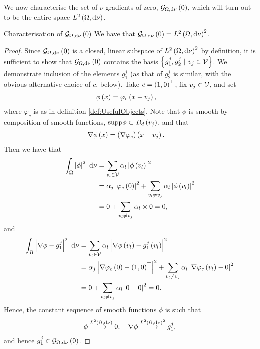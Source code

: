 We now characterise the set of $\nu$-gradients of zero, $\mathcal{G}_{ \Omega, \mathrm{d}\nu}\left( 0 \right)$, which will turn out to be the entire space $L^{2}\left( \Omega,\mathrm{d}\nu \right)$.
\begin{prop}{Characterisation of $\mathcal{G}_{ \Omega, \mathrm{d}\nu}\left( 0 \right)$} \label{prop:CharPointMassGradZero}
	We have that $\mathcal{G}_{ \Omega, \mathrm{d}\nu}\left( 0 \right) = L^{2}\left( \Omega,\mathrm{d}\nu \right)^2$.
\end{prop}
\begin{proof}
	Since $\mathcal{G}_{ \Omega, \mathrm{d}\nu}\left( 0 \right)$ is a closed, linear subspace of $L^{2}\left( \Omega,\mathrm{d}\nu \right)^2$ by definition, it is sufficient to show that $\mathcal{G}_{ \Omega, \mathrm{d}\nu}\left( 0 \right)$ contains the basis $\clbracs{g_1^j, g_2^j \ \vert \ v_j\in\vertSet}$.
	We demonstrate inclusion of the elements $g^j_1$ (as that of $g^j_2$ is similar, with the obvious alternative choice of $c$, below).
	Take $c=\left( 1,0 \right)^{\top}$, fix $v_j\in\mathcal{V}$, and set
	\begin{align*}
		\phi\left( x \right) &= \varphi_c\left( x-v_j \right),
	\end{align*}
	where $\varphi_c$ is as in definition \ref{def:UsefulObjects}.
	Note that $\phi$ is smooth by composition of smooth functions, $\mathrm{supp}\phi\subset B_{d}\left( v_j \right)$, and that
	\begin{align*}
		\nabla\phi\left( x \right) &= \left( \nabla\varphi_c \right)\left( x-v_j \right).
	\end{align*}
	Then we have that
	\begin{align*}
		\int_{\Omega}\left\lvert \phi \right\rvert^2 \ \mathrm{d}\nu &= \sum_{v_l\in\mathcal{V}} \alpha_l\left\lvert \phi\left( v_l \right) \right\rvert^2 \\
		&= \alpha_j\left\lvert \varphi_c\left( 0 \right) \right\rvert^2 + \sum_{v_l\neq v_j}\alpha_l\left\lvert \phi\left( v_l \right) \right\rvert^2 \\
		&= 0 + \sum_{v_l\neq v_j} \alpha_l \times 0 = 0,
	\end{align*}
	and
	\begin{align*}
		\int_{\Omega}\left\lvert \nabla\phi - g^j_1 \right\rvert^2 \ \mathrm{d}\nu &= \sum_{v_l\in\mathcal{V}} \alpha_l\left\lvert \nabla\phi\left( v_l \right) - g^j_1\left( v_l \right) \right\rvert^2 \\
		&= \alpha_j\left\lvert \nabla\varphi_c\left( 0 \right) - \left( 1,0 \right)^{\top} \right\rvert^2 + \sum_{v_l\neq v_j} \alpha_l\left\lvert \nabla\varphi_c\left( v_l \right) - 0 \right\rvert^2 \\
		&= 0 + \sum_{v_l\neq v_j} \alpha_l\left\lvert 0 - 0 \right\rvert^2 = 0.
	\end{align*}
	Hence, the constant sequence of smooth functions $\phi$ is such that
	\begin{align*}
		\phi\overset{L^{2}\left( \Omega,\mathrm{d}\nu \right)}{\longrightarrow}0, \quad \nabla\phi\overset{L^{2}\left( \Omega,\mathrm{d}\nu \right)^2}{\longrightarrow} g^j_1,
	\end{align*}
	and hence $g^j_1\in\mathcal{G}_{ \Omega, \mathrm{d}\nu}\left( 0 \right)$.
\end{proof}

